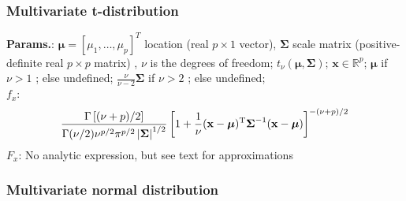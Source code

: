    
        
\subsubsection{Multivariate t-distribution}





    {\color{darkblue} \textbf{Params.}:} {$\boldsymbol\mu = [\mu_1, \dots, \mu_p]^T$ location (real $p\times 1$ vector),  $\boldsymbol\Sigma$ scale matrix (positive-definite real $p\times p$ matrix) ,  $\nu$ is the degrees of freedom}; {$t_\nu(\boldsymbol\mu,\boldsymbol\Sigma)$}; {$\mathbf{x} \in\mathbb{R}^p\!$}; {$\boldsymbol\mu$ if $\nu > 1$ ; else undefined}; {$\frac{\nu}{\nu-2} \boldsymbol\Sigma$ if $\nu > 2$ ; else undefined};\hspace{0.5cm}\\{\color{darkblue} \textbf{$f_x$}:} {$$\frac{\Gamma\left[(\nu+p)/2\right]}{\Gamma(\nu/2)\nu^{p/2}\pi^{p/2}\left|{\boldsymbol\Sigma}\right|^{1/2}}\left[1+\frac{1}{\nu}({\mathbf x}-{\boldsymbol\mu})^{\rm T}{\boldsymbol\Sigma}^{-1}({\mathbf x}-{\boldsymbol\mu})\right]^{-(\nu+p)/2}$$}{\color{darkblue} \textbf{$F_x$}:} {No analytic expression, but see text for approximations}



    
        
\subsubsection{Multivariate normal distribution}





